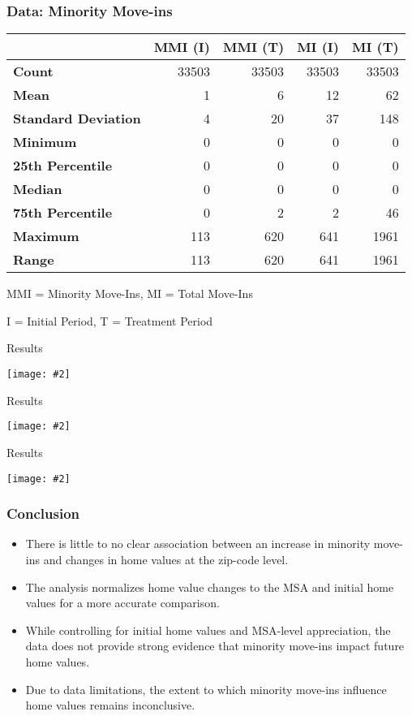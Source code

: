 \documentclass[aspectratio=169]{beamer}
\newcommand {\framedgraphic}[2] {
    \begin{frame}{#1}
        \begin{center}
            \texttt{[image: \#2]}
        \end{center}
    \end{frame}
}
\begin{document}
\begin{frame}
    \frametitle{Data: Minority Move-ins}
    \centering\begin{tabular}{lrrrr}
        \toprule
         & MMI (I) & MMI (T) & MI (I) & MI (T) \\
        \midrule
        \textbf{Count} & 33503 & 33503 & 33503 & 33503 \\
        \textbf{Mean} & 1 & 6 & 12 & 62 \\
        \textbf{Standard Deviation} & 4 & 20 & 37 & 148 \\
        \textbf{Minimum} & 0 & 0 & 0 & 0 \\
        \textbf{25th Percentile} & 0 & 0 & 0 & 0 \\
        \textbf{Median} & 0 & 0 & 0 & 0 \\
        \textbf{75th Percentile} & 0 & 2 & 2 & 46 \\
        \textbf{Maximum} & 113 & 620 & 641 & 1961 \\
        \textbf{Range} & 113 & 620 & 641 & 1961 \\
        \bottomrule
        \end{tabular}

        MMI = Minority Move-Ins, MI = Total Move-Ins
        
        I = Initial Period, T = Treatment Period
\end{frame}
\framedgraphic{Results}{project_files/project_43_1.png}
\framedgraphic{Results}{project_files/project_39_0.png}
\framedgraphic{Results}{project_files/project_49_1.png}
\begin{frame}
\frametitle{Conclusion}
\begin{itemize}
    \item There is little to no clear association between an increase in minority move-ins and changes in home values at the zip-code level.
    \item The analysis normalizes home value changes to the MSA and initial home values for a more accurate comparison.
    \item While controlling for initial home values and MSA-level appreciation, the data does not provide strong evidence that minority move-ins impact future home values.
    \item Due to data limitations, the extent to which minority move-ins influence home values remains inconclusive.
\end{itemize}
\end{frame}
\end{document}
